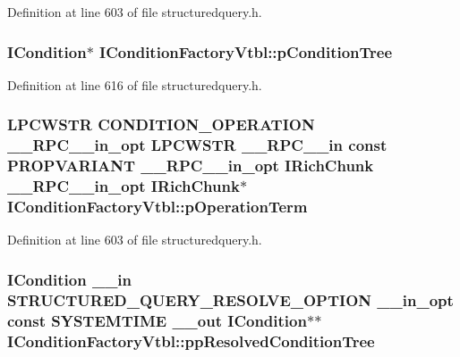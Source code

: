 Definition at line 603 of file structuredquery.\+h.

\subsubsection[{\texorpdfstring{p\+Condition\+Tree}{pConditionTree}}]{ {\bf I\+Condition}$\ast$ I\+Condition\+Factory\+Vtbl\+::p\+Condition\+Tree}\hypertarget{struct_i_condition_factory_vtbl_a37491ee881f8f7514c288e4054004f56}{}\label{struct_i_condition_factory_vtbl_a37491ee881f8f7514c288e4054004f56}


Definition at line 616 of file structuredquery.\+h.

\subsubsection[{\texorpdfstring{p\+Operation\+Term}{pOperationTerm}}]{ {\bf L\+P\+C\+W\+S\+TR} {\bf C\+O\+N\+D\+I\+T\+I\+O\+N\+\_\+\+O\+P\+E\+R\+A\+T\+I\+ON} {\bf \+\_\+\+\_\+\+R\+P\+C\+\_\+\+\_\+in\+\_\+opt} {\bf L\+P\+C\+W\+S\+TR} {\bf \+\_\+\+\_\+\+R\+P\+C\+\_\+\+\_\+in} {\bf const} {\bf P\+R\+O\+P\+V\+A\+R\+I\+A\+NT} {\bf \+\_\+\+\_\+\+R\+P\+C\+\_\+\+\_\+in\+\_\+opt} {\bf I\+Rich\+Chunk} {\bf \+\_\+\+\_\+\+R\+P\+C\+\_\+\+\_\+in\+\_\+opt} {\bf I\+Rich\+Chunk}$\ast$ I\+Condition\+Factory\+Vtbl\+::p\+Operation\+Term}\hypertarget{struct_i_condition_factory_vtbl_a389ef74afceb195d655990b53f3bae1d}{}\label{struct_i_condition_factory_vtbl_a389ef74afceb195d655990b53f3bae1d}


Definition at line 603 of file structuredquery.\+h.

\subsubsection[{\texorpdfstring{pp\+Resolved\+Condition\+Tree}{ppResolvedConditionTree}}]{ {\bf I\+Condition} {\bf \+\_\+\+\_\+in} {\bf S\+T\+R\+U\+C\+T\+U\+R\+E\+D\+\_\+\+Q\+U\+E\+R\+Y\+\_\+\+R\+E\+S\+O\+L\+V\+E\+\_\+\+O\+P\+T\+I\+ON} {\bf \+\_\+\+\_\+in\+\_\+opt} {\bf const} S\+Y\+S\+T\+E\+M\+T\+I\+ME {\bf \+\_\+\+\_\+out} {\bf I\+Condition}$\ast$$\ast$ I\+Condition\+Factory\+Vtbl\+::pp\+Resolved\+Condition\+Tree}\hypertarget{struct_i_condition_factory_vtbl_a2814274e2d8835743bfa8cb633089a7f}{}\label{struct_i_condition_factory_vtbl_a2814274e2d8835743bfa8cb633089a7f}


